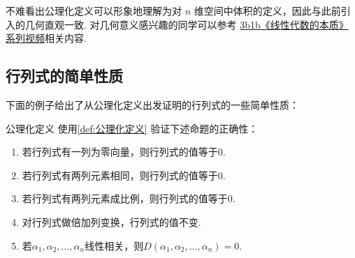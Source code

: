 不难看出公理化定义可以形象地理解为对 $n$ 维空间中体积的定义，因此与此前引入的几何直观一致. 对几何意义感兴趣的同学可以参考 \href{https://b23.tv/BV1ys411472E}{3b1b《线性代数的本质》系列视频}相关内容.

\subsection{行列式的简单性质}

下面的例子给出了从公理化定义出发证明的行列式的一些简单性质：
\begin{example}{}{公理化定义}
    使用\autoref{def:公理化定义} 验证下述命题的正确性：
    \begin{enumerate}
        \item 若行列式有一列为零向量，则行列式的值等于0.

        \item 若行列式有两列元素相同，则行列式的值等于0.

        \item 若行列式有两列元素成比例，则行列式的值等于0.

        \item 对行列式做倍加列变换，行列式的值不变.

        \item \label{item:13:公理化定义导出性质:5}
            若$\alpha_1,\alpha_2,\ldots,\alpha_n$线性相关，则$D(\alpha_1,\alpha_2,\ldots,\alpha_n)=0$.
    \end{enumerate}
\end{example}

